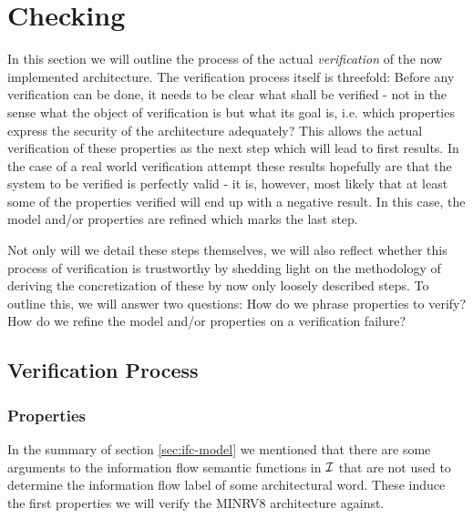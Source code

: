 
\section{Checking}
\label{sec:checking}

In this section we will outline the process of the actual \textit{verification} of the now implemented architecture.
The verification process itself is threefold:
Before any verification can be done, it needs to be clear what shall be verified - not in the sense what the object of verification is but what its goal is, i.e. which properties express the security of the architecture adequately?
This allows the actual verification of these properties as the next step which will lead to first results.
In the case of a real world verification attempt these results hopefully are that the system to be verified is perfectly valid - it is, however, most likely that at least some of the properties verified will end up with a negative result.
In this case, the model and/or properties are refined which marks the last step.

Not only will we detail these steps themselves, we will also reflect whether this process of verification is trustworthy by shedding light on the methodology of deriving the concretization of these by now only loosely described steps.
To outline this, we will answer two questions:
How do we phrase properties to verify?
How do we refine the model and/or properties on a verification failure?

\subsection{Verification Process}

\subsubsection{Properties}
\label{sec:props}

In the summary of section \ref{sec:ifc-model} we mentioned that there are some arguments to the information flow semantic functions in $ \mathcal{I} $ that are not used to determine the information flow label of some architectural word.
These induce the first properties we will verify the MINRV8 architecture against.


